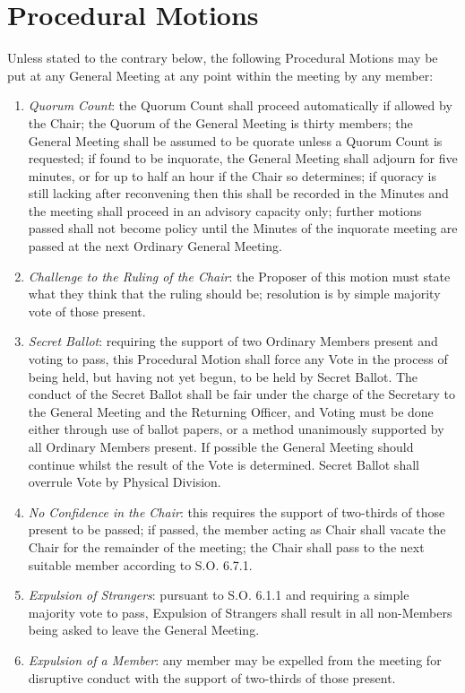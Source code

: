 \section{Procedural Motions}
\npara Unless stated to the contrary below, the following Procedural Motions may be put at any General Meeting at any point within the meeting by any member:
\begin{enumerate}
\item \textit{Quorum Count}: the Quorum Count shall proceed automatically if allowed by the Chair; the Quorum of the General Meeting is thirty members; the General Meeting shall be assumed to be quorate unless a Quorum Count is requested; if found to be inquorate, the General Meeting shall adjourn for five minutes, or for up to half an hour if the Chair so determines; if quoracy is still lacking after reconvening then this shall be recorded in the Minutes and the meeting shall proceed in an advisory capacity only; further motions passed shall not become policy until the Minutes of the inquorate meeting are passed at the next Ordinary General Meeting.
\item \textit{Challenge to the Ruling of the Chair}: the Proposer of this motion must state what they think that the ruling should be; resolution is by simple majority vote of those present.
\item \textit{Secret Ballot}: requiring the support of two Ordinary Members present and voting to pass, this Procedural Motion shall force any Vote in the process of being held, but having not yet begun, to be held by Secret Ballot. The conduct of the Secret Ballot shall be fair under the charge of the Secretary to the General Meeting and the Returning Officer, and Voting must be done either through use of ballot papers, or a method unanimously supported by all Ordinary Members present. If possible the General Meeting should continue whilst the result of the Vote is determined. Secret Ballot shall overrule Vote by Physical Division.
\item \textit{No Confidence in the Chair}: this requires the support of two-thirds of those present to be passed; if passed, the member acting as Chair shall vacate the Chair for the remainder of the meeting; the Chair shall pass to the next suitable member according to S.O. 6.7.1.
\item \textit{Expulsion of Strangers}: pursuant to S.O. 6.1.1 and requiring a simple majority vote to pass, Expulsion of Strangers shall result in all non-Members being asked to leave the General Meeting.
\item \textit{Expulsion of a Member}: any member may be expelled from the meeting for disruptive conduct with the support of two-thirds of those present.

\end{enumerate}
